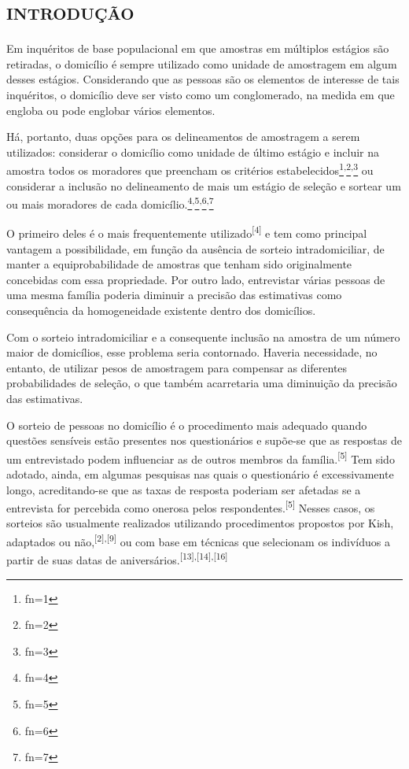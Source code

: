 \documentclass{article}
\makeatletter
\newcommand{\fn}{\afterassignment\fn@aux\count0=}
\newcommand{\fn@aux}{\csname fn\the\count0\endcsname}
\makeatother
\begin{document}
\section{\textsc{introdução}}

Em inquéritos de base populacional em que amostras em múltiplos estágios são
retiradas, o domicílio é sempre utilizado como unidade de amostragem em algum
desses estágios. Considerando que as pessoas são os elementos de interesse de
tais inquéritos, o domicílio deve ser visto como um conglomerado, na medida em
que engloba ou pode englobar vários elementos.

Há, portanto, duas opções para os delineamentos de amostragem a serem
utilizados: considerar o domicílio como unidade de último estágio e incluir na
amostra todos os moradores que preencham os critérios
estabelecidos\footnote{\fn1}\textsuperscript{,}\footnote{\fn2}\textsuperscript{,}\footnote{\fn3}
ou considerar a inclusão no delineamento de mais um estágio de seleção e sortear
um ou mais moradores de cada domicílio.\footnote{\fn4}\textsuperscript{,}\footnote{\fn5}\textsuperscript{,}\footnote{\fn6}\textsuperscript{,}\footnote{\fn7}

O primeiro deles é o mais frequentemente
utilizado\textsuperscript{[}\textsuperscript{4}\textsuperscript{]}
e tem como principal vantagem a possibilidade, em função da ausência de sorteio
intradomiciliar, de manter a equiprobabilidade de amostras que tenham sido
originalmente concebidas com essa propriedade. Por outro lado, entrevistar
várias pessoas de uma mesma família poderia diminuir a precisão das estimativas
como consequência da homogeneidade existente dentro dos domicílios.

Com o sorteio intradomiciliar e a consequente inclusão na amostra de um número
maior de domicílios, esse problema seria contornado. Haveria necessidade, no
entanto, de utilizar pesos de amostragem para compensar as diferentes
probabilidades de seleção, o que também acarretaria uma diminuição da precisão
das estimativas.

O sorteio de pessoas no domicílio é o procedimento mais adequado quando questões
sensíveis estão presentes nos questionários e supõe-se que as respostas de um
entrevistado podem influenciar as de outros membros da
família.\textsuperscript{[}\textsuperscript{5}\textsuperscript{]}
Tem sido adotado, ainda, em algumas pesquisas nas quais o questionário é
excessivamente longo, acreditando-se que as taxas de resposta poderiam ser
afetadas se a entrevista for percebida como onerosa pelos
respondentes.\textsuperscript{[}\textsuperscript{5}\textsuperscript{]}
Nesses casos, os sorteios são usualmente realizados utilizando procedimentos
propostos por Kish, adaptados ou não,\textsuperscript{[}\textsuperscript{2}\textsuperscript{]}\textsuperscript{,}\textsuperscript{[}\textsuperscript{9}\textsuperscript{]}
ou com base em técnicas que selecionam os indivíduos a partir de suas datas de
aniversários.\textsuperscript{[}\textsuperscript{13}\textsuperscript{]}\textsuperscript{,}\textsuperscript{[}\textsuperscript{14}\textsuperscript{]}\textsuperscript{,}\textsuperscript{[}\textsuperscript{16}\textsuperscript{]}
\end{document}
